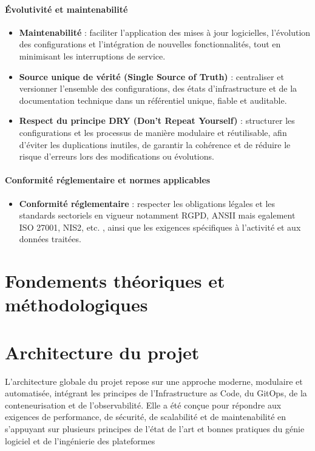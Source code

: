 \paragraph{\textbf{Évolutivité et maintenabilité}}

\begin{itemize}
	\item \textbf{Maintenabilité} : faciliter l'application des mises à jour logicielles, l'évolution des configurations et l'intégration de nouvelles fonctionnalités, tout en minimisant les interruptions de service.
	\item \textbf{Source unique de vérité (Single Source of Truth)} : centraliser et versionner l'ensemble des configurations, des états d'infrastructure et de la documentation technique dans un référentiel unique, fiable et auditable.
	\item \textbf{Respect du principe DRY (Don’t Repeat Yourself)} : structurer les configurations et les processus de manière modulaire et réutilisable, afin d'éviter les duplications inutiles, de garantir la cohérence et de réduire le risque d'erreurs lors des modifications ou évolutions.
\end{itemize}

\paragraph{\textbf{Conformité réglementaire et normes applicables}}

\begin{itemize}
	\item \textbf{Conformité réglementaire} : respecter les obligations légales et les standards sectoriels en vigueur notamment RGPD, ANSII mais egalement ISO 27001, NIS2, etc. , ainsi que les exigences spécifiques à l'activité et aux données traitées.
\end{itemize}

\section{Fondements théoriques et méthodologiques}
\section{Architecture du projet}

L'architecture globale du projet repose sur une approche moderne, modulaire et automatisée, intégrant les principes de l'Infrastructure as Code, du GitOps, de la conteneurisation et de l'observabilité. Elle a été conçue pour répondre aux exigences de performance, de sécurité, de scalabilité et de maintenabilité en s'appuyant sur plusieurs principes de l’état de l’art et bonnes pratiques du génie logiciel et de l’ingénierie des plateformes

